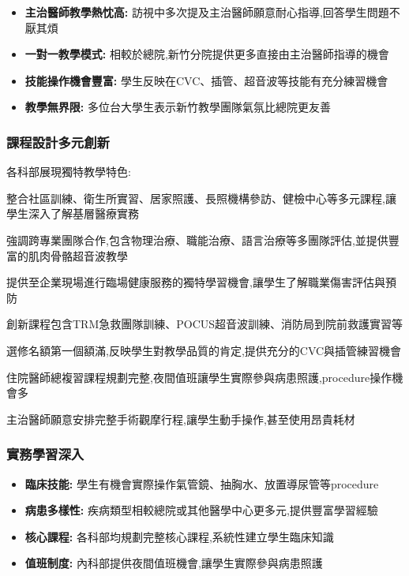 \documentclass[12pt,a4paper]{article}
\begin{document}
\begin{itemize}[leftmargin=*]
\item \textbf{主治醫師教學熱忱高:} 訪視中多次提及主治醫師願意耐心指導,回答學生問題不厭其煩
\item \textbf{一對一教學模式:} 相較於總院,新竹分院提供更多直接由主治醫師指導的機會
\item \textbf{技能操作機會豐富:} 學生反映在CVC、插管、超音波等技能有充分練習機會
\item \textbf{教學無界限:} 多位台大學生表示新竹教學團隊氣氛比總院更友善
\end{itemize}

\subsubsection{課程設計多元創新}

各科部展現獨特教學特色:

\begin{description}[leftmargin=2cm,style=nextline]
\item[家庭醫學部] 整合社區訓練、衛生所實習、居家照護、長照機構參訪、健檢中心等多元課程,讓學生深入了解基層醫療實務

\item[復健部] 強調跨專業團隊合作,包含物理治療、職能治療、語言治療等多團隊評估,並提供豐富的肌肉骨骼超音波教學

\item[環境及職業醫學部] 提供至企業現場進行臨場健康服務的獨特學習機會,讓學生了解職業傷害評估與預防

\item[急診醫學部] 創新課程包含TRM急救團隊訓練、POCUS超音波訓練、消防局到院前救護實習等

\item[麻醉部] 選修名額第一個額滿,反映學生對教學品質的肯定,提供充分的CVC與插管練習機會

\item[內科部] 住院醫師總複習課程規劃完整,夜間值班讓學生實際參與病患照護,procedure操作機會多

\item[外科部] 主治醫師願意安排完整手術觀摩行程,讓學生動手操作,甚至使用昂貴耗材
\end{description}

\subsubsection{實務學習深入}

\begin{itemize}[leftmargin=*]
\item \textbf{臨床技能:} 學生有機會實際操作氣管鏡、抽胸水、放置導尿管等procedure
\item \textbf{病患多樣性:} 疾病類型相較總院或其他醫學中心更多元,提供豐富學習經驗
\item \textbf{核心課程:} 各科部均規劃完整核心課程,系統性建立學生臨床知識
\item \textbf{值班制度:} 內科部提供夜間值班機會,讓學生實際參與病患照護
\end{itemize}
\end{document}
